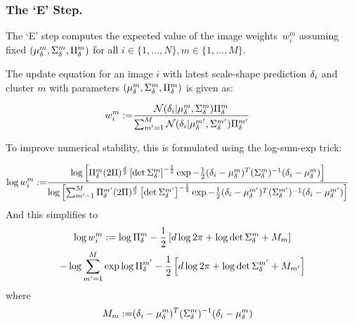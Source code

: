 \subsubsection{The `E' Step.}
The `E' step computes the expected value of the image weights~$w_{i}^{m}$ 
assuming fixed $(\mu_{\delta}^{m},\Sigma_{\delta}^{m},\Pi_{\delta}^{m})$ for all $i \in \{1,\dots,N\}, m \in \{1,\dots,M\}$.

The update equation for an image $i$ with latest scale-shape prediction $\delta_{i}$ and cluster $m$ with parameters $(\mu_{\delta}^{m},\Sigma_{\delta}^{m},\Pi_{\delta}^{m})$ 
is given as:

\begin{align}
    w_{i}^{m}
    :=& 
    \frac{
        \mathcal{N}(\delta_{i} | \mu_{\delta}^{m},\Sigma_{\delta}^{m})\Pi_{\delta}^{m}
    }
    {
        \sum_{m'=1}^{M}
        \mathcal{N}(\delta_{i} | \mu_{\delta}^{m'},\Sigma_{\delta}^{m'})\Pi_{\delta}^{m'}
    }
\end{align}

To improve numerical stability, this is formulated using the log-sum-exp trick:

\begin{align}
    \log{w_{i}^{m}}
    :=& 
    \frac{
        \log{
            \left[
            \Pi_{\delta}^{m} (2\Pi)^{\frac{d}{2}}
            \left[\det{\Sigma_{\delta}^{m}}\right]^{-\frac{1}{2}}
            \exp{
                -\frac{1}{2}
                (\delta_{i} - \mu_{\delta}^{m})^{T}
                (\Sigma_{\delta}^{m})^{-1}
                (\delta_{i} - \mu_{\delta}^{m})
            }
        \right]
        }
    }
    {
        \log{
            \left[
            \sum_{m'=1}^{M}
            \Pi_{\delta}^{m'} (2\Pi)^{\frac{d}{2}}
            \left[\det{\Sigma_{\delta}^{m'}}\right]^{-\frac{1}{2}}
            \exp{
                -\frac{1}{2}
                (\delta_{i} - \mu_{\delta}^{m'})^{T}
                (\Sigma_{\delta}^{m'})^{-1}
                (\delta_{i} - \mu_{\delta}^{m'})
            }
        \right]
        }
    }
\end{align}
And this simplifies to
\begin{multline}
    \log{w_{i}^{m}}
    :=
    \log{\Pi_{\delta}^{m}} - \frac{1}{2}
        \left[
            d\log{2\pi} + \log{\det{\Sigma_{\delta}^{m}}} + M_{m}
        \right] \\ -
    \log{
        \sum_{m'=1}^{M} 
        \exp{
            \log{\Pi_{\delta}^{m'}} - \frac{1}{2}
            \left[
                d\log{2\pi} + \log{\det{\Sigma_{\delta}^{m'}}} + M_{m'}
            \right]
        }
    }
\end{multline}
where
\begin{align}
M_{m} :=& 
    (\delta_{i} - \mu_{\delta}^{m})^{T}
    (\Sigma_{\delta}^{m})^{-1}
    (\delta_{i} - \mu_{\delta}^{m})    
\end{align}


